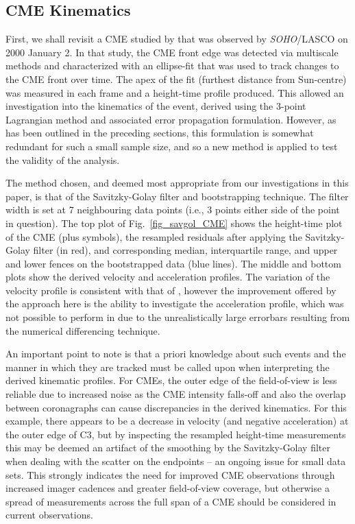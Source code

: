 \documentclass[structabstract]{aa}
\begin{document}
\subsection{CME Kinematics}
\label{subsect:corimp}


First, we shall revisit a CME studied by \citet{2009A&A...495..325B} that was observed by \emph{SOHO}/LASCO on 2000 January 2. In that study, the CME front edge was detected via multiscale methods and characterized with an ellipse-fit that was used to track changes to the CME front over time. The apex of the fit (furthest distance from Sun-centre) was measured in each frame and a height-time profile produced. This allowed an investigation into the kinematics of the event, derived using the 3-point Lagrangian method and associated error propagation formulation. However, as has been outlined in the preceding sections, this formulation is somewhat redundant for such a small sample size, and so a new method is applied to test the validity of the analysis.

The method chosen, and deemed most appropriate from our investigations in this paper, is that of the Savitzky-Golay filter and bootstrapping technique. The filter width is set at 7 neighbouring data points (i.e., 3 points either side of the point in question). The top plot of Fig.~\ref{fig_savgol_CME} shows the height-time plot of the CME (plus symbols), the resampled residuals after applying the Savitzky-Golay filter (in red), and corresponding median, interquartile range, and upper and lower fences on the bootstrapped data (blue lines). The middle and bottom plots show the derived velocity and acceleration profiles. The variation of the velocity profile is consistent with that of \citet{2009A&A...495..325B}, however the improvement offered by the approach here is the ability to investigate the acceleration profile, which was not possible to perform in \citet{2009A&A...495..325B} due to the unrealistically large errorbars resulting from the numerical differencing technique.

An important point to note is that a priori knowledge about such events and the manner in which they are tracked must be called upon when interpreting the derived kinematic profiles. For CMEs, the outer edge of the field-of-view is less reliable due to increased noise as the CME intensity falls-off and also the overlap between coronagraphs can cause discrepancies in the derived kinematics. For this example, there appears to be a decrease in velocity (and negative acceleration) at the outer edge of C3, but by inspecting the resampled height-time measurements this may be deemed an artifact of the smoothing by the Savitzky-Golay filter when dealing with the scatter on the endpoints -- an ongoing issue for small data sets. This strongly indicates the need for improved CME observations through increased imager cadences and greater field-of-view coverage, but otherwise a spread of measurements across the full span of a CME should be considered in current observations.
\end{document}
